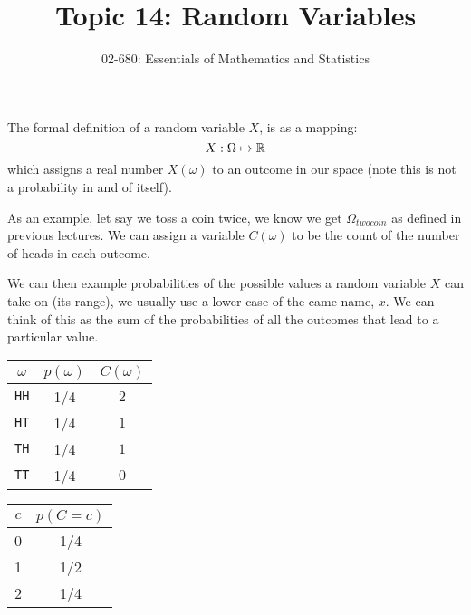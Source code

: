 

\title{Topic 14: Random Variables}
\author{02-680: Essentials of Mathematics and Statistics}


\maketitle

The formal definition of a random variable $X$, is as a mapping: \[X: \Omega \mapsto \operatorname{\mathbb{R}}\]
which assigns a real number $X(\omega)$ to an outcome in our space (note this is not a probability in and of itself). 

As an example, let say we toss a coin twice, we know we get $\Omega_{twocoin}$ as defined in previous lectures. 
We can assign a variable $C(\omega)$ to be the count of the number of heads in each outcome.


We can then example probabilities of the possible values a random variable $X$ can take on (its range), 
we usually use a lower case of the came name, $x$. 
We can think of this as the sum of the probabilities 
of all the outcomes that lead to a particular value. 

\begin{center}
\begin{tabular}{c|c|c}
\textbf{$\omega$} & \textbf{$p(\omega)$} & \textbf{$C(\omega)$}\\
\hline
\texttt{HH}		& 1/4 &		$2$\\
\texttt{HT}		& 1/4 &		$1$\\
\texttt{TH}		& 1/4 &		$1$\\
\texttt{TT}		& 1/4 &		$0$\\
\end{tabular}%
%
\hspace{5em}%
%
\begin{tabular}{c|c}
\textbf{$c$} &	\textbf{$p(C=c)$}\\
\hline
0 &		1/4\\
1 &		1/2\\
2 & 		1/4\\
\end{tabular}
\end{center}

